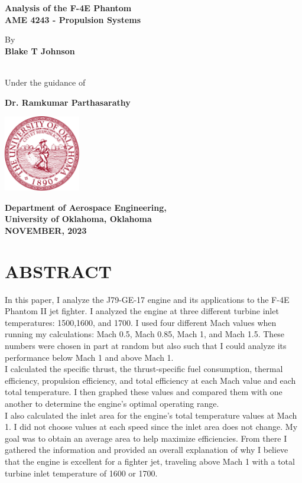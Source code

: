 \documentclass[12pt]{report}
\date{}
\begin{document}
\doublespacing
\thispagestyle{empty}
\vspace*{0.5cm}
\begin{center}
\textbf{ \Large
Analysis of the F-4E Phantom \\
}
\vspace*{2cm}
\textbf{AME 4243 - Propulsion Systems} 
\vspace*{2cm}

By \\
\vspace*{1cm}
\textbf{Blake T Johnson}

\textbf{}
\vspace*{2cm} \\
Under the guidance of

\textbf{Dr. Ramkumar Parthasarathy}
\vspace*{2cm}
\begin{center}
\includegraphics[max width=0.25\textwidth]{Images/University_of_Oklahoma_seal.svg.png}
\end{center}

\textbf{Department of Aerospace Engineering, \\ University of Oklahoma, Oklahoma \\ NOVEMBER, 2023}
\end{center}


\newpage
\vspace*{3cm}
\chapter*{ABSTRACT}
In this paper, I analyze the J79-GE-17 engine and its applications to the F-4E Phantom II jet fighter.  I analyzed the engine at three different turbine inlet temperatures: 1500,1600, and 1700.  I used four different Mach values when running my calculations: Mach 0.5, Mach 0.85, Mach 1, and Mach 1.5. These numbers were chosen in part at random but also such that I could analyze its performance below Mach 1 and above Mach 1.\\
I calculated the specific thrust, the thrust-specific fuel consumption, thermal efficiency, propulsion efficiency, and total efficiency at each Mach value and each total temperature.  I then graphed these values and compared them with one another to determine the engine's optimal operating range.\\
I also calculated the inlet area for the engine's total temperature values at Mach 1.  I did not choose values at each speed since the inlet area does not change. My goal was to obtain an average area to help maximize efficiencies. From there I gathered the information and provided an overall explanation of why I believe that the engine is excellent for a fighter jet, traveling above Mach 1 with a total turbine inlet temperature of 1600 or 1700.
\end{document}
